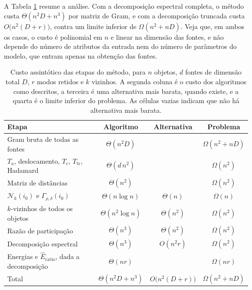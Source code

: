 A Tabela \ref{tab:custo} resume a análise. Com a decomposição espectral completa, o método custa $\Theta(n^2 D + n^3)$ por matriz de Gram, e com a decomposição truncada custa $O\bigl(n^2 (D + r)\bigr)$, contra um limite inferior de $\Omega(n^2 + nD)$. Veja que, em ambos os casos, o custo é polinomial em $n$ e linear na dimensão das fontes, e não depende do número de atributos da entrada nem do número de parâmetros do modelo, que entram apenas na obtenção das fontes.

\begin{table}[pos=htbp]
\centering
\caption{Custo assintótico das etapas do método, para $n$ objetos, $d$ fontes de dimensão total $D$, $r$ modos retidos e $k$ vizinhos. A segunda coluna é o custo dos algoritmos como descritos, a terceira é uma alternativa mais barata, quando existe, e a quarta é o limite inferior do problema. As células vazias indicam que não há alternativa mais barata.}
\label{tab:custo}
\small
\begin{tabular}{l c c c}
\hline
Etapa & Algoritmo & Alternativa & Problema \\
\hline
Gram bruta de todas as fontes & $\Theta(n^2 D)$ & & $\Omega(n^2 + nD)$ \\
$T_a$, deslocamento, $T_c$, $T_{\mathrm{tr}}$, Hadamard & $\Theta(d\,n^2)$ & & $\Omega(n^2)$ \\
Matriz de distâncias & $\Theta(n^2)$ & & $\Omega(n^2)$ \\
$\mathcal{N}_k(i_0)$ e $\Gamma_{\rho,\delta}(i_0)$ & $\Theta(n \log n)$ & $\Theta(n)$ & $\Omega(n)$ \\
$k$-vizinhos de todos os objetos & $\Theta(n^2 \log n)$ & $\Theta(n^2)$ & $\Omega(n^2)$ \\
Razão de participação & $\Theta(n^3)$ & $\Theta(n^2)$ & $\Omega(n^2)$ \\
Decomposição espectral & $\Theta(n^3)$ & $O(n^2 r)$ & $\Omega(n^2)$ \\
Energias e $\widehat{E}_{\mathrm{ratio}}$, dada a decomposição & $\Theta(nr)$ & & $\Omega(nr)$ \\
\hline
Total & $\Theta(n^2 D + n^3)$ & $O\bigl(n^2(D + r)\bigr)$ & $\Omega(n^2 + nD)$ \\
\hline
\end{tabular}
\end{table}